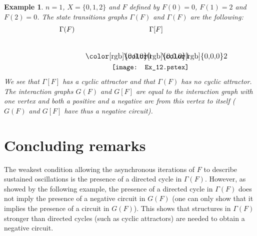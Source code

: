 \documentclass[11pt]{article}
\newtheorem{example}{Example}
\begin{document}
\begin{example}
$n=1$, $X=\{0,1,2\}$ and $F$ defined by $F(0)=0$, $F(1)=2$ and
$F(2)=0$. The state transitions graphs $\Gamma(F)$ and $\Gamma(F)$ are
the following:
\[
\begin{array}{ccc}
\Gamma(F)&&\Gamma[F]\\[5mm]
&~~~~~~~~~~&\begin{picture}(0,0)\texttt{[image: Ex\_12.pstex]}\end{picture}\setlength{\unitlength}{3947sp}\begingroup\makeatletter\ifx\SetFigFont\undefined \gdef\SetFigFont#1#2#3#4#5{\reset@font\fontsize{#1}{#2pt}\fontfamily{#3}\fontseries{#4}\fontshape{#5}\selectfont}\fi\endgroup \begin{picture}(2104,602)(1800,-1862)
\put(1951,-1606){\makebox(0,0)[b]{\smash{{\SetFigFont{11}{13.2}{\rmdefault}{\mddefault}{\updefault}{\color[rgb]{0,0,0}$0$}}}}}
\put(2866,-1606){\makebox(0,0)[b]{\smash{{\SetFigFont{11}{13.2}{\rmdefault}{\mddefault}{\updefault}{\color[rgb]{0,0,0}$1$}}}}}
\put(3766,-1606){\makebox(0,0)[b]{\smash{{\SetFigFont{11}{13.2}{\rmdefault}{\mddefault}{\updefault}{\color[rgb]{0,0,0}$2$}}}}}
\end{picture} \end{array}
\]
We see that $\Gamma[F]$ has a cyclic attractor and that $\Gamma(F)$
has no cyclic attractor. The interaction graphs $G(F)$ and $G[F]$ are
equal to the interaction graph with one vertex and both a positive and
a negative arc from this vertex to itself ($G(F)$ and $G[F]$ have thus
a negative circuit).
\end{example}


{\section{Concluding remarks}}


The weakest condition allowing the asynchronous iterations of $F$ to
describe sustained oscillations is the presence of a directed cycle in
$\Gamma(F)$. However, as showed by the following example, the presence
of a directed cycle in $\Gamma(F)$ does not imply the presence of a
negative circuit in $G(F)$ (one can only show that it implies the
presence of a circuit in $G(F)$). This shows that structures in
$\Gamma(F)$ stronger than directed cycles (such as cyclic attractors)
are needed to obtain a negative circuit.
\end{document}
